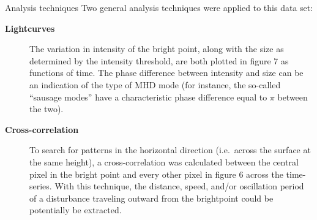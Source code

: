 \documentclass[t]{beamer}
\begin{document}
\begin{frame}[t]
\begin{block}{}
\begin{columns}
        \begin{block}{Analysis techniques}
            Two general analysis techniques were applied to this data set:
            \begin{description}
                \item [\textbf{Lightcurves}] The variation in intensity of the bright
                    point, along with the size as determined by the intensity
                    threshold, are both plotted in \textcolor{myred}{figure 7}
                    as functions of time. The phase difference between intensity and
                    size can be an indication of the type of MHD mode (for instance, the
                    so-called ``sausage modes'' have a characteristic phase
                    difference equal to $\pi$ between the two).
                \item [\textbf{Cross-correlation}] To search for patterns in the
                    horizontal direction (i.e.\ across the surface at the
                    same height), a cross-correlation was calculated between
                    the central pixel in the bright point and every other
                    pixel in figure 6 across the time-series.
                    With this technique, the distance, speed,
                    and/or oscillation period of a disturbance traveling
                    outward from the brightpoint could be potentially be extracted.
            \end{description}
        \end{block}



\end{columns}
\end{block}
\end{frame}
\end{document}
